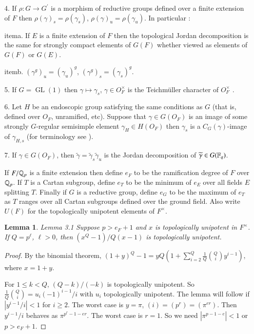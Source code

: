 \documentclass[11pt]{amsart}
\theoremstyle{plain}
\newtheorem{lemma}[theorem]{Lemma}
\theoremstyle{definition}
\def\Rats{{\Bbb Q}}                          %
\def\GL{\operatorname{GL}}
\def\IWASAWA{14}
\def\LANGLANDSO{21}
\begin{document}
{4.} If $\rho:G\to G^\prime$ is a morphism of reductive groups
defined over a finite extension of $F$ then $\rho(\gamma)_s=\rho(\gamma_s)$,
$\rho(\gamma)_u =\rho(\gamma_u)$. In particular :

item{a.} 
If $E$ is a finite  extension of $F$
then the topological Jordan decomposition is the same
for strongly compact elements of $G(F)$ whether viewed as elements of
$G(F)$ or $G({E})$.

item{b.}
$(\gamma^g)_u = (\gamma_u)^g$, $(\gamma^g)_s = (\gamma_s)^g$.

{5.} If $G=\GL(1)$
then $\gamma\mapsto\gamma_s$,
$\gamma\in O_F^\times$ is the Teichm\"uller 
character of $O_F^\times$ \cite{\IWASAWA}.

{6.}  Let $H$ be an endoscopic group satisfying
the same conditions as $G$ (that is, defined over $O_F$, unramified,
etc). Suppose that $\gamma\in G(O_F)$ is an image of
some strongly $G$-regular semisimple element 
$\gamma_H\in H(O_F)$ then
$\gamma_s$ is a $C_G(\gamma)$-image of 
$\gamma_{H,s}$ (for terminology see \cite{\LANGLANDSO}).

{7.} If $\gamma\in G(O_F)$, then $\widetilde \gamma=\widetilde\gamma_s\widetilde\gamma_u$
is the Jordan decomposition of $\widetilde\gamma\in G({\Bbb F_q})$.
\par
\smallskip

If $F/\Rats_p$ is a finite extension then define $e_F$ to be the ramification
degree of $F$ over $\Rats_p$.  If $T$ is a Cartan subgroup, define $e_T$ to be
the minimum of $e_E$ over all fields $E$ splitting $T$.  Finally if $G$ is a
reductive group, define $e_G$ to be the maximum of $e_T$ as $T$ ranges over all
Cartan subgroups defined over the ground field.  Also write $U(F)$ for the topologically
unipotent elements of $F^\times$.

\begin{lemma}{Lemma 3.1}  Suppose $p> e_F+1$ and $x$ is topologically
unipotent in $F^\times$.
If $Q=p^\ell$, $\ell>0$, then $(x^Q-1)/Q(x-1)$ is topologically unipotent.
\end{lemma}

\begin{proof}
By the binomial theorem, $(1+y)^Q-1 = yQ(1+\sum_{i=2}^Q 
\frac1Q{Q\choose i}y^{i-1})$, where $x=1+y$.

For $1\le k< Q$, $(Q-k)/(-k)$ is topologically unipotent.
So $\frac1Q{Q\choose i}=u_i(-1)^{i-1}/i$ with $u_i$ topologically
unipotent.  The lemma will follow if 
$|{y^{i-1}}/i|<1$ for $i\ge2$.
The worst case is
$y=\pi$, $(i)=(p^r)=(\pi^{er})$. Then  $y^{i-1}/i$
behaves as $\pi^{p^r-1-er}$.  The worst case is $r=1$. So we need
$|\pi^{p-1-e}|<1$ or $p>e_F+1$.
\end{proof}
\end{document}
